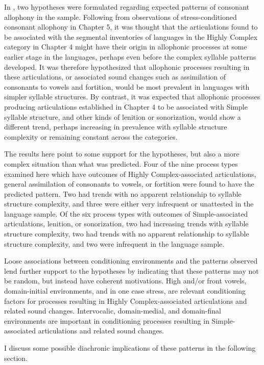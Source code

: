   In , two hypotheses were formulated regarding expected patterns of consonant allophony in the sample. Following from observations of stress-conditioned consonant allophony in Chapter 5, it was thought that the articulations found to be associated with the segmental inventories of languages in the Highly Complex category in Chapter 4 might have their origin in allophonic processes at some earlier stage in the languages, perhaps even before the complex syllable patterns developed. It was therefore hypothesized that allophonic processes resulting in these articulations, or associated sound changes such as assimilation of consonants to vowels and fortition, would be most prevalent in languages with simpler syllable structures. By contrast, it was expected that allophonic processes producing articulations established in Chapter 4 to be associated with Simple syllable structure, and other kinds of lenition or sonorization, would show a different trend, perhaps increasing in prevalence with syllable structure complexity or remaining constant across the categories.

  The results here point to some support for the hypotheses, but also a more complex situation than what was predicted. Four of the nine process types examined here which have outcomes of Highly Complex-associated articulations, general assimilation of consonants to vowels, or fortition were found to have the predicted pattern. Two had trends with no apparent relationship to syllable structure complexity, and three were either very infrequent or unattested in the language sample. Of the six process types with outcomes of Simple-associated articulations, lenition, or sonorization, two had increasing trends with syllable structure complexity, two had trends with no apparent relationship to syllable structure complexity, and two were infrequent in the language sample.

  Loose associations between conditioning environments and the patterns observed lend further support to the hypotheses by indicating that these patterns may not be random, but instead have coherent motivations. High and/or front vowels, domain-initial environments, and in one case stress, are relevant conditioning factors for processes resulting in Highly Complex-associated articulations and related sound changes. Intervocalic, domain-medial, and domain-final environments are important in conditioning processes resulting in Simple-associated articulations and related sound changes. 

  I discuss some possible diachronic implications of these patterns in the following section.

